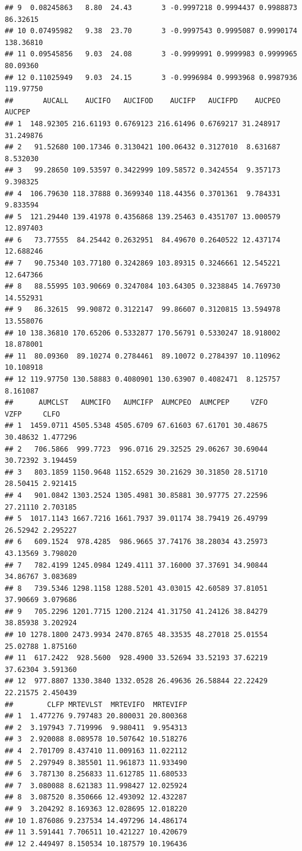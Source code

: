 \documentclass[
  12pt,
]{krantz}
\begin{document}
\begin{verbatim}
## 9  0.08245863   8.80  24.43       3 -0.9997218 0.9994437 0.9988873  86.32615
## 10 0.07495982   9.38  23.70       3 -0.9997543 0.9995087 0.9990174 138.36810
## 11 0.09545856   9.03  24.08       3 -0.9999991 0.9999983 0.9999965  80.09360
## 12 0.11025949   9.03  24.15       3 -0.9996984 0.9993968 0.9987936 119.97750
##       AUCALL    AUCIFO   AUCIFOD    AUCIFP   AUCIFPD    AUCPEO    AUCPEP
## 1  148.92305 216.61193 0.6769123 216.61496 0.6769217 31.248917 31.249876
## 2   91.52680 100.17346 0.3130421 100.06432 0.3127010  8.631687  8.532030
## 3   99.28650 109.53597 0.3422999 109.58572 0.3424554  9.357173  9.398325
## 4  106.79630 118.37888 0.3699340 118.44356 0.3701361  9.784331  9.833594
## 5  121.29440 139.41978 0.4356868 139.25463 0.4351707 13.000579 12.897403
## 6   73.77555  84.25442 0.2632951  84.49670 0.2640522 12.437174 12.688246
## 7   90.75340 103.77180 0.3242869 103.89315 0.3246661 12.545221 12.647366
## 8   88.55995 103.90669 0.3247084 103.64305 0.3238845 14.769730 14.552931
## 9   86.32615  99.90872 0.3122147  99.86607 0.3120815 13.594978 13.558076
## 10 138.36810 170.65206 0.5332877 170.56791 0.5330247 18.918002 18.878001
## 11  80.09360  89.10274 0.2784461  89.10072 0.2784397 10.110962 10.108918
## 12 119.97750 130.58883 0.4080901 130.63907 0.4082471  8.125757  8.161087
##      AUMCLST   AUMCIFO   AUMCIFP  AUMCPEO  AUMCPEP     VZFO     VZFP     CLFO
## 1  1459.0711 4505.5348 4505.6709 67.61603 67.61701 30.48675 30.48632 1.477296
## 2   706.5866  999.7723  996.0716 29.32525 29.06267 30.69044 30.72392 3.194459
## 3   803.1859 1150.9648 1152.6529 30.21629 30.31850 28.51710 28.50415 2.921415
## 4   901.0842 1303.2524 1305.4981 30.85881 30.97775 27.22596 27.21110 2.703185
## 5  1017.1143 1667.7216 1661.7937 39.01174 38.79419 26.49799 26.52942 2.295227
## 6   609.1524  978.4285  986.9665 37.74176 38.28034 43.25973 43.13569 3.798020
## 7   782.4199 1245.0984 1249.4111 37.16000 37.37691 34.90844 34.86767 3.083689
## 8   739.5346 1298.1158 1288.5201 43.03015 42.60589 37.81051 37.90669 3.079686
## 9   705.2296 1201.7715 1200.2124 41.31750 41.24126 38.84279 38.85938 3.202924
## 10 1278.1800 2473.9934 2470.8765 48.33535 48.27018 25.01554 25.02788 1.875160
## 11  617.2422  928.5600  928.4900 33.52694 33.52193 37.62219 37.62304 3.591360
## 12  977.8807 1330.3840 1332.0528 26.49636 26.58844 22.22429 22.21575 2.450439
##        CLFP MRTEVLST  MRTEVIFO  MRTEVIFP
## 1  1.477276 9.797483 20.800031 20.800368
## 2  3.197943 7.719996  9.980411  9.954313
## 3  2.920088 8.089578 10.507642 10.518276
## 4  2.701709 8.437410 11.009163 11.022112
## 5  2.297949 8.385501 11.961873 11.933490
## 6  3.787130 8.256833 11.612785 11.680533
## 7  3.080088 8.621383 11.998427 12.025924
## 8  3.087520 8.350666 12.493092 12.432287
## 9  3.204292 8.169363 12.028695 12.018220
## 10 1.876086 9.237534 14.497296 14.486174
## 11 3.591441 7.706511 10.421227 10.420679
## 12 2.449497 8.150534 10.187579 10.196436
\end{verbatim}
\end{document}
